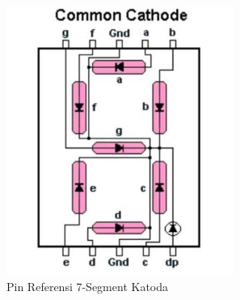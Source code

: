 \begin{figure}[H]
    \centering
    \includegraphics[width=0.4\linewidth]{P2/img/7segment.png}
    \caption{Pin Referensi 7-Segment Katoda}
    \label{fig:Referensi7Segment}
\end{figure}

